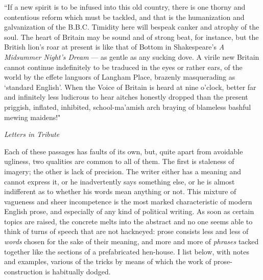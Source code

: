 \documentclass[12pt]{article}
\newcommand{\aquote}[2]{\footnotesize \begin{displayquote} ``#1" \end{displayquote} \hfill \textit{#2}}
\begin{document}
\begin{enumerate}
	\aquote{If a new spirit is to be infused into this old country, there is one thorny and contentious reform which must be tackled, and that is the humanization and galvanization of the B.B.C. Timidity here will bespeak canker and atrophy of the soul. The heart of Britain may be sound and of strong beat, for instance, but the British lion's roar at present is like that of Bottom in Shakespeare's \textit{A Midsummer Night's Dream} — as gentle as any sucking dove. A virile new Britain cannot continue indefinitely to be traduced in the eyes or rather ears, of the world by the effete languors of Langham Place, brazenly masquerading as ‘standard English’. When the Voice of Britain is heard at nine o'clock, better far and infinitely less ludicrous to hear aitches honestly dropped than the present priggish, inflated, inhibited, school-ma'amish arch braying of blameless bashful mewing maidens!}{Letters in Tribute}\label{5}
\end{enumerate}
Each of these passages has faults of its own, but, quite apart from avoidable ugliness, two qualities are common to all of them. The first is staleness of imagery; the other is lack of precision. The writer either has a meaning and cannot express it, or he inadvertently says something else, or he is almost indifferent as to whether his words mean anything or not. This mixture of vagueness and sheer incompetence is the most marked characteristic of modern English prose, and especially of any kind of political writing. As soon as certain topics are raised, the concrete melts into the abstract and no one seems able to think of turns of speech that are not hackneyed: prose consists less and less of \textit{words} chosen for the sake of their meaning, and more and more of \textit{phrases} tacked together like the sections of a prefabricated hen-house. I list below, with notes and examples, various of the tricks by means of which the work of prose-construction is habitually dodged.
\end{document}
